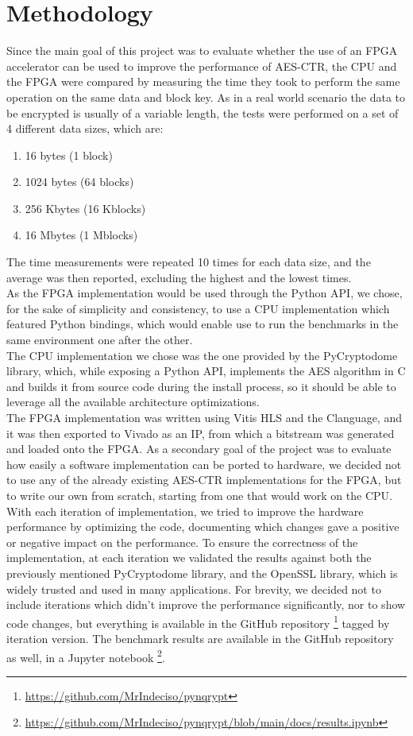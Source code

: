 \documentclass[12pt,oneside,a4paper]{article}
\def\CC{{C\nolinebreak[4]\hspace{-.05em}\raisebox{.4ex}{\tiny\bf ++}}}
\begin{document}
\section{Methodology} \label{sec:methodology}
Since the main goal of this project was to evaluate whether the use of an FPGA accelerator can be used to improve the performance of AES-CTR, the CPU and the FPGA were compared by measuring the time they took to perform the same operation on the same data and block key.
As in a real world scenario the data to be encrypted is usually of a variable length, the tests were performed on a set of 4 different data sizes, which are:
\begin{enumerate}
	\item 16 bytes (1 block)
	\item 1024 bytes (64 blocks)
	\item 256 Kbytes (16 Kblocks)
	\item 16 Mbytes (1 Mblocks)
\end{enumerate}
The time measurements were repeated 10 times for each data size, and the average was then reported, excluding the highest and the lowest times.
\\As the FPGA implementation would be used through the Python API, we chose, for the sake of simplicity and consistency, to use a CPU implementation which featured Python bindings, which would enable use to run the benchmarks in the same environment one after the other.
\\The CPU implementation we chose was the one provided by the PyCryptodome library, which, while exposing a Python API, implements the AES algorithm in C and builds it from source code during the install process, so it should be able to leverage all the available architecture optimizations.
\\The FPGA implementation was written using Vitis HLS and the \CC language, and it was then exported to Vivado as an IP, from which a bitstream was generated and loaded onto the FPGA.
As a secondary goal of the project was to evaluate how easily a software implementation can be ported to hardware, we decided not to use any of the already existing AES-CTR implementations for the FPGA, but to write our own from scratch, starting from one that would work on the CPU.
With each iteration of implementation, we tried to improve the hardware performance by optimizing the code, documenting which changes gave a positive or negative impact on the performance.
To ensure the correctness of the implementation, at each iteration we validated the results against both the previously mentioned PyCryptodome library, and the OpenSSL library, which is widely trusted and used in many applications.
For brevity, we decided not to include iterations which didn't improve the performance significantly, nor to show code changes, but everything is available in the GitHub repository \footnote{\url{https://github.com/MrIndeciso/pynqrypt}} tagged by iteration version.
The benchmark results are available in the GitHub repository as well, in a Jupyter notebook \footnote{\url{https://github.com/MrIndeciso/pynqrypt/blob/main/docs/results.ipynb}}.
\end{document}
